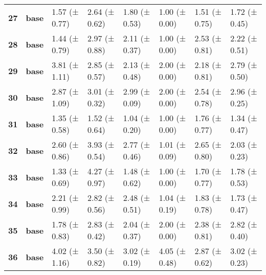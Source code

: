 \begin{longtable}{llllllll}
\cline{1-8}
\textbf{27} & \textbf{base} & 1.57 (± 0.77) & 2.64 (± 0.62) & 1.80 (± 0.53) & 1.00 (± 0.00) & 1.51 (± 0.75) & 1.72 (± 0.45) \\
\cline{1-8}
\textbf{28} & \textbf{base} & 1.44 (± 0.79) & 2.97 (± 0.88) & 2.11 (± 0.37) & 1.00 (± 0.00) & 2.53 (± 0.81) & 2.22 (± 0.51) \\
\cline{1-8}
\textbf{29} & \textbf{base} & 3.81 (± 1.11) & 2.85 (± 0.57) & 2.13 (± 0.48) & 2.00 (± 0.00) & 2.18 (± 0.81) & 2.79 (± 0.50) \\
\cline{1-8}
\textbf{30} & \textbf{base} & 2.87 (± 1.09) & 3.01 (± 0.32) & 2.99 (± 0.09) & 2.00 (± 0.00) & 2.54 (± 0.78) & 2.96 (± 0.25) \\
\cline{1-8}
\textbf{31} & \textbf{base} & 1.35 (± 0.58) & 1.52 (± 0.64) & 1.04 (± 0.20) & 1.00 (± 0.00) & 1.76 (± 0.77) & 1.34 (± 0.47) \\
\cline{1-8}
\textbf{32} & \textbf{base} & 2.60 (± 0.86) & 3.93 (± 0.54) & 2.77 (± 0.46) & 1.01 (± 0.09) & 2.65 (± 0.80) & 2.03 (± 0.23) \\
\cline{1-8}
\textbf{33} & \textbf{base} & 1.33 (± 0.69) & 4.27 (± 0.97) & 1.48 (± 0.62) & 1.00 (± 0.00) & 1.70 (± 0.77) & 1.78 (± 0.53) \\
\cline{1-8}
\textbf{34} & \textbf{base} & 2.21 (± 0.99) & 2.82 (± 0.56) & 2.48 (± 0.51) & 1.04 (± 0.19) & 1.83 (± 0.78) & 1.73 (± 0.47) \\
\cline{1-8}
\textbf{35} & \textbf{base} & 1.78 (± 0.83) & 2.83 (± 0.42) & 2.04 (± 0.37) & 2.00 (± 0.00) & 2.38 (± 0.81) & 2.82 (± 0.40) \\
\cline{1-8}
\textbf{36} & \textbf{base} & 4.02 (± 1.16) & 3.50 (± 0.82) & 3.02 (± 0.19) & 4.05 (± 0.48) & 2.87 (± 0.62) & 3.02 (± 0.23) \\
\cline{1-8}
\end{longtable}
